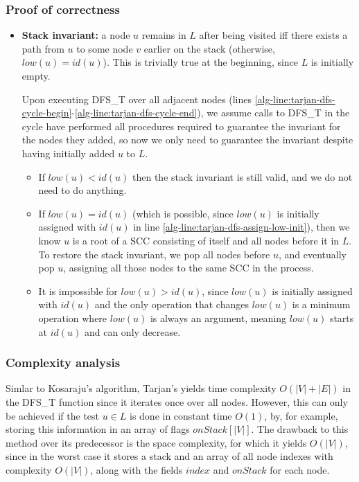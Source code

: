 \subsubsection{Proof of correctness}
\begin{itemize}
    \item \textbf{Stack invariant:} a node $u$ remains in $L$ after being visited iff there exists a path from $u$ to some node $v$ earlier on the stack (otherwise, $low(u)=id(u)$). This is trivially true at the beginning, since $L$ is initially empty.\par
    Upon executing \textsc{DFS\_T} over all adjacent nodes (lines \ref*{alg-line:tarjan-dfs-cycle-begin}-\ref*{alg-line:tarjan-dfs-cycle-end}), we assume calls to \textsc{DFS\_T} in the cycle have performed all procedures required to guarantee the invariant for the nodes they added, so now we only need to guarantee the invariant despite having initially added $u$ to $L$.
    \begin{itemize}
        \item If $low(u) < id(u)$ then the stack invariant is still valid, and we do not need to do anything.
        \item If $low(u)=id(u)$ (which is possible, since $low(u)$ is initially assigned with $id(u)$ in line \ref{alg-line:tarjan-dfs-assign-low-init}), then we know $u$ is a root of a \acrshort*{SCC} consisting of itself and all nodes before it in $L$. To restore the stack invariant, we pop all nodes before $u$, and eventually pop $u$, assigning all those nodes to the same \acrshort*{SCC} in the process.
        \item It is impossible for $low(u) > id(u)$, since $low(u)$ is initially assigned with $id(u)$ and the only operation that changes $low(u)$ is a minimum operation where $low(u)$ is always an argument, meaning $low(u)$ starts at $id(u)$ and can only decrease.
    \end{itemize}
\end{itemize}
\subsubsection{Complexity analysis}
Simlar to Kosaraju's algorithm, Tarjan's yields time complexity $O(|V|+|E|)$ in the \textsc{DFS\_T} function since it iterates once over all nodes. However, this can only be achieved if the test $u \in L$ is done in constant time $O(1)$, by, for example, storing this information in an array of flags $onStack[|V|]$.
The drawback to this method over its predecessor is the space complexity, for which it yields $O(|V|)$, since in the worst case it stores a stack and an array of all node indexes with complexity $O(|V|)$, along with the fields $index$ and $onStack$ for each node. 